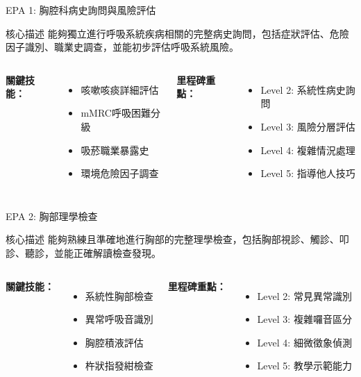 \documentclass[aspectratio=169]{beamer}
\begin{document}
\begin{frame}{EPA 1: 胸腔科病史詢問與風險評估}
\begin{alertblock}{核心描述}
能夠獨立進行呼吸系統疾病相關的完整病史詢問，包括症狀評估、危險因子識別、職業史調查，並能初步評估呼吸系統風險。
\end{alertblock}

\begin{columns}[c]
\textbf{關鍵技能：}
\begin{itemize}
\item 咳嗽咳痰詳細評估
\item mMRC呼吸困難分級
\item 吸菸職業暴露史
\item 環境危險因子調查
\end{itemize}

\textbf{里程碑重點：}
\begin{itemize}
\item Level 2: 系統性病史詢問
\item Level 3: 風險分層評估
\item Level 4: 複雜情況處理
\item Level 5: 指導他人技巧
\end{itemize}
\end{columns}
\end{frame}

\begin{frame}{EPA 2: 胸部理學檢查}
\begin{alertblock}{核心描述}
能夠熟練且準確地進行胸部的完整理學檢查，包括胸部視診、觸診、叩診、聽診，並能正確解讀檢查發現。
\end{alertblock}

\begin{columns}[c]
\textbf{關鍵技能：}
\begin{itemize}
\item 系統性胸部檢查
\item 異常呼吸音識別
\item 胸腔積液評估
\item 杵狀指發紺檢查
\end{itemize}

\textbf{里程碑重點：}
\begin{itemize}
\item Level 2: 常見異常識別
\item Level 3: 複雜囉音區分
\item Level 4: 細微徵象偵測
\item Level 5: 教學示範能力
\end{itemize}
\end{columns}
\end{frame}
\end{document}
